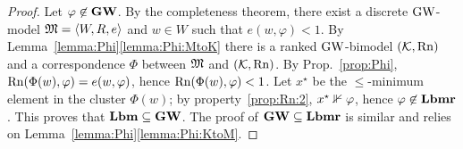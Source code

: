 \begin{proof}
Let $\varphi\not\in \mathbf{GW}$. By the completeness theorem, 
there exist a discrete $\mbox{$\mathrm{GW}$}$-model $\mathfrak{M}=\langle W,R,e \rangle$ and $w\in W$ such that $e(w,\varphi)<1$.
By Lemma~\ref{lemma:Phi}\ref{lemma:Phi:MtoK} there is a ranked
$\mbox{$\mathrm{GW}$}$-bimodel $(\mathcal{K},\mathrm{Rn})$ and a correspondence $\Phi$ between $\mathfrak{M}$
and $(\mathcal{K},\mathrm{Rn})$. By Prop.~\ref{prop:Phi}, $\mathrm{Rn}(\Phi(w),\varphi) =
e(w,\varphi)$, hence $\mathrm{Rn}(\Phi(w),\varphi) < 1$.
Let $x^\star$  be the $\leq$-minimum element in the cluster $\Phi(w)$;
by  property~\ref{prop:Rn:2},   $x^\star\nVdash \varphi$,
hence  $\varphi\not\in \mathbf{Lbmr}$. This proves that $\mathbf{Lbm}\subseteq \mathbf{GW}$.  The
proof of $\mathbf{GW}\subseteq \mathbf{Lbmr}$ is similar and relies on
Lemma~\ref{lemma:Phi}\ref{lemma:Phi:KtoM}.
  
\end{proof}




